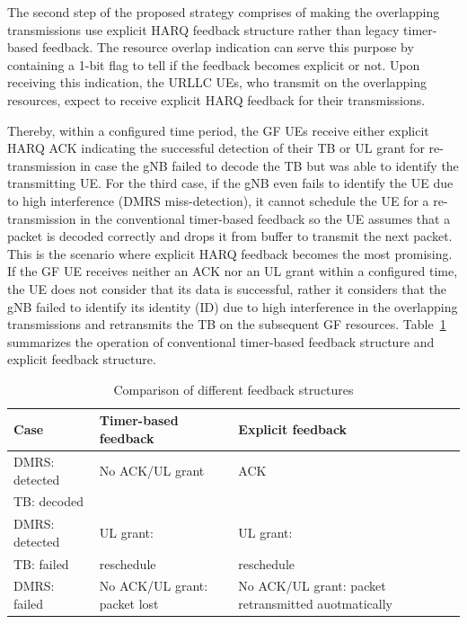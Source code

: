 \documentclass[conference]{IEEEtran}
\begin{document}
The second step of the proposed strategy comprises of making the overlapping transmissions use explicit HARQ feedback structure rather than legacy timer-based feedback. The resource overlap indication can serve this purpose by containing a 1-bit flag to tell if the feedback becomes explicit or not. Upon receiving this indication, the URLLC UEs, who transmit on the overlapping resources, expect to receive explicit HARQ feedback for their transmissions. 

Thereby, within a configured time period, the GF UEs receive either explicit HARQ ACK indicating the successful detection of their TB or UL grant for re-transmission in case the gNB failed to decode the TB but was able to identify the transmitting UE.  For the third case, if the gNB even fails to identify the UE due to high interference (DMRS miss-detection), it cannot schedule the UE for a re-transmission in the conventional timer-based feedback so the UE assumes that a packet is decoded correctly and drops it from buffer to transmit the next packet. This is the scenario where explicit HARQ feedback becomes the most promising. If the GF UE receives neither an ACK nor an UL grant within a configured time, the UE does not consider that its data is successful, rather it considers that the gNB failed to identify its identity (ID) due to high interference in the overlapping transmissions and retransmits the TB on the subsequent GF resources. Table~\ref{tab3} summarizes the operation of conventional timer-based feedback structure and explicit feedback structure.

\begin{table}[htbp]
\caption{Comparison of different feedback structures}
\begin{center}
\begin{tabular}{|p{8em}|p{7em}|p{7em}|}
 \hline
 \textbf{Case} & \textbf{Timer-based feedback}&\textbf{Explicit feedback}\\
 \hline
 DMRS: detected&No ACK/UL grant&ACK\\TB: decoded & &\\
 \hline
  DMRS: detected&UL grant: &UL grant:\\TB: failed & reschedule&reschedule\\
 \hline
DMRS: failed&No ACK/UL grant: packet lost&No ACK/UL grant: packet retransmitted auotmatically\\

 
 \hline
\end{tabular}
\label{tab3}
\end{center}
\vspace{-4mm}
\end{table}
\end{document}

